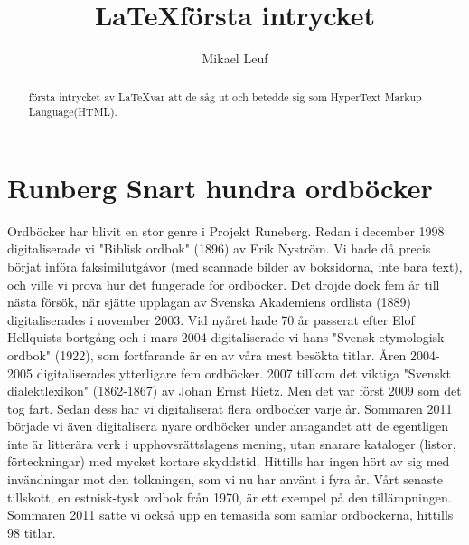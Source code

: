 \documentclass{article}[a4paper, 11pt]
\begin{document}
	\title{\LaTeX första intrycket}
	\author{Mikael Leuf}
	\begin{titlepage}
		\maketitle
		\thispagestyle{empty}
	\end{titlepage}
	\pagebreak
	\begin{abstract}
		första intrycket av \LaTeX var att de såg ut och betedde sig som HyperText Markup Language(HTML).
	\end{abstract}
	\pagebreak
	\tableofcontents
	\thispagestyle{empty}
	\pagebreak

	\section{Runberg Snart hundra ordböcker}
		Ordböcker har blivit en stor genre i Projekt Runeberg. Redan i december 1998 digitaliserade vi "Biblisk ordbok" (1896) av Erik Nyström. 
		Vi hade då precis börjat införa faksimilutgåvor (med scannade bilder av boksidorna, inte bara text), och ville vi prova hur det fungerade för ordböcker. Det dröjde dock fem år till nästa försök, när sjätte upplagan av Svenska Akademiens ordlista (1889) digitaliserades i november 2003. Vid nyåret hade 70 år passerat efter Elof Hellquists bortgång och i mars 2004 digitaliserade vi hans "Svensk etymologisk ordbok" (1922), som fortfarande är en av våra mest besökta titlar. Åren 2004-2005 digitaliserades ytterligare fem ordböcker. 2007 tillkom det viktiga "Svenskt dialektlexikon" (1862-1867) av Johan Ernst Rietz. Men det var först 2009 som det tog fart. Sedan dess har vi digitaliserat flera ordböcker varje år. Sommaren 2011 började vi även digitalisera nyare ordböcker under antagandet att de egentligen inte är litterära verk i upphovsrättslagens mening, utan snarare kataloger (listor, förteckningar) med mycket kortare skyddstid. Hittills har ingen hört av sig med invändningar mot den tolkningen, som vi nu har använt i fyra år. Vårt senaste tillskott, en estnisk-tysk ordbok från 1970, är ett exempel på den tillämpningen. Sommaren 2011 satte vi också upp en temasida som samlar ordböckerna, hittills 98 titlar.
\end{document}
